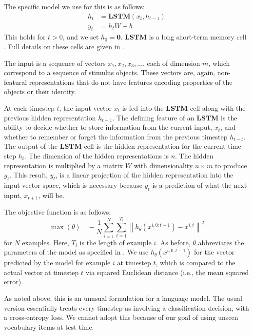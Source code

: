 \documentclass[9pt,twocolumn,twoside,lineno]{pnas-new}
\newcommand{\update}[1]{{\color{darkblue}#1}}
\newcommand{\LSTM}{\textbf{LSTM}}
\begin{document}
The specific model we use for this is as follows:
%
\begin{align}
  h_{t} &= \LSTM(x_{t}, h_{t-1}) \label{eq:lstm-recur}\\
  y_{t} &= h_{t}W + b\label{eq:lstm-predict}
\end{align}
%
This holds for $t > 0$, and we set $h_{0} = \mathbf{0}$. $\LSTM$ is a long short-term memory cell \cite{hochreiter:1997}. Full details on these cells are given in .

The input is a sequence of vectors $x_1, x_2, x_3, \dots$, each of dimension $m$, which correspond to a sequence of stimulus objects.  These vectors are, again, non-featural representations that do not have features encoding properties of the objects or their identity.


At each timestep $t$, the input vector $x_t$ is fed into the $\LSTM$ cell along with the previous hidden representation $h_{t-1}$. The defining feature of an $\LSTM$ is the ability to decide whether to store information from the current input, $x_t$, and whether to remember or forget the information from the previous timestep $h_{t-t}$. The output of the $\LSTM$ cell is the hidden representation for the current time step $h_t$. The dimension of the hidden representations is $n$. The hidden representation is multiplied by a matrix $W$ with dimensionality $n \times m$ to produce $y_t$. This result, $y_t$, is a linear projection of the hidden representation into the input vector space, which is necessary because $y_t$ is a prediction of what the next input, $x_{t+1}$, will be.

\update{
  The objective function is as follows:
%
\begin{equation}
  \max(\theta)
  \quad
  -\frac{1}{N}
  \sum_{i=1}^{N}
  \sum_{t=1}^{T_{i}}
  \left\| h_{\theta}\left(x^{i, 0:{t-1}}\right) - x^{i,t} \right\|^{2}
\end{equation}
%
for $N$ examples. Here, $T_{i}$ is the length of example $i$. As before, $\theta$ abbreviates the parameters of the model as specified in \dasheg{eq:lstm-recur}{eq:lstm-predict}. We use $h_{\theta}(x^{i, 0:{t-1}})$ for the vector predicted by the model for example $i$ at timestep $t$, which is compared to the actual vector at timestep $t$ via squared Euclidean distance (i.e., the mean squared error).

As noted above, this is an unusual formulation for a language model. The usual version essentially treats every timestep as involving a classification decision, with a cross-entropy loss. We cannot adopt this because of our goal of using unseen vocabulary items at test time.}
\end{document}
